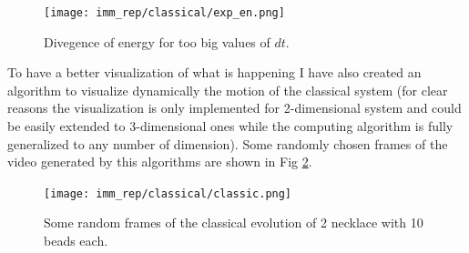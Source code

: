\documentclass[10pt,a4paper]{article}
\begin{document}
\begin{figure}[h]
	\begin{center}
		\texttt{[image: imm\_rep/classical/exp\_en.png]}
	\end{center}
	\caption{Divegence of energy for too big values of $dt$.}
	\label{fig: exp_en}
\end{figure}

\vspace{15pt}

To have a better visualization of what is happening I have also created an algorithm to visualize dynamically the motion of the classical system (for clear reasons the visualization is only implemented for 2-dimensional system and could be easily extended to 3-dimensional ones while the computing algorithm is fully generalized to any number of dimension). Some randomly chosen frames of the video generated by this algorithms are shown in Fig \ref{fig: classic}.
\begin{figure}[h]
	\begin{center}
		\texttt{[image: imm\_rep/classical/classic.png]}
	\end{center}
	\caption{Some random frames of the classical evolution of 2 necklace with 10 beads each.}
	\label{fig: classic}
\end{figure}
\end{document}
